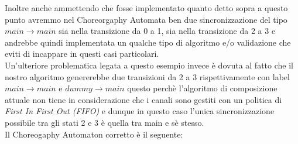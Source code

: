 Inoltre anche ammettendo che fosse implementato quanto detto sopra a questo punto avremmo nel Choreorgaphy Automata ben due sincronizzazione del tipo $main \rightarrow main$ sia nella transizione da 0 a 1, sia nella transizione da 2 a 3 e andrebbe quindi implementata un qualche tipo di algoritmo e/o validazione che eviti di incappare in questi casi particolari.\\
Un'ulteriore problematica legata a questo esempio invece è dovuta al fatto che il nostro algoritmo genererebbe due transizioni da 2 a 3 rispettivamente con label $main \rightarrow main$ e $dummy \rightarrow main$ questo perchè l'algoritmo di composizione attuale non tiene in considerazione che i canali sono gestiti con un politica di \emph{First In First Out (FIFO)} e dunque in questo caso l'unica sincronizzazione possibile tra gli stati 2 e 3 è quella tra main e sè stesso.\bigskip \\
Il Choreogaphy Automaton corretto è il seguente:
\begin{figure}[h!]
\end{figure}